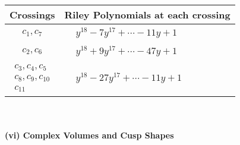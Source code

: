 \documentclass[1p]{elsarticle_modified}
\theoremstyle{definition}
\begin{document}
\begin{tabular}{m{50pt}|m{274pt}}
Crossings & \hspace{64pt}Riley Polynomials at each crossing \\
\hline $$\begin{aligned}c_{1},c_{7}\end{aligned}$$&$\begin{aligned}
&y^{18}-7 y^{17}+\cdots-11 y+1
\end{aligned}$\\
\hline $$\begin{aligned}c_{2},c_{6}\end{aligned}$$&$\begin{aligned}
&y^{18}+9 y^{17}+\cdots-47 y+1
\end{aligned}$\\
\hline $$\begin{aligned}c_{3},c_{4},c_{5}\\c_{8},c_{9},c_{10}\\c_{11}\end{aligned}$$&$\begin{aligned}
&y^{18}-27 y^{17}+\cdots-11 y+1
\end{aligned}$\\
\hline
\end{tabular}\\~\\
\newpage\flushleft \textbf{(vi) Complex Volumes and Cusp Shapes}
\end{document}
